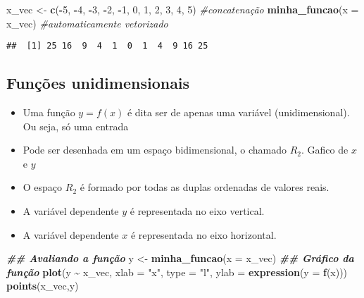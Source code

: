 \documentclass[
]{article}
\newenvironment{Shaded}{\begin{snugshade}}{\end{snugshade}}
\newcommand{\AttributeTok}[1]{\textcolor[rgb]{0.13,0.29,0.53}{#1}}
\newcommand{\CommentTok}[1]{\textcolor[rgb]{0.56,0.35,0.01}{\textit{#1}}}
\newcommand{\DecValTok}[1]{\textcolor[rgb]{0.00,0.00,0.81}{#1}}
\newcommand{\DocumentationTok}[1]{\textcolor[rgb]{0.56,0.35,0.01}{\textbf{\textit{#1}}}}
\newcommand{\FunctionTok}[1]{\textcolor[rgb]{0.13,0.29,0.53}{\textbf{#1}}}
\newcommand{\NormalTok}[1]{#1}
\newcommand{\OtherTok}[1]{\textcolor[rgb]{0.56,0.35,0.01}{#1}}
\newcommand{\SpecialCharTok}[1]{\textcolor[rgb]{0.81,0.36,0.00}{\textbf{#1}}}
\newcommand{\StringTok}[1]{\textcolor[rgb]{0.31,0.60,0.02}{#1}}
\providecommand{\tightlist}{%
  \setlength{\itemsep}{0pt}\setlength{\parskip}{0pt}}
\begin{document}
\begin{Shaded}
\begin{Highlighting}[]
\NormalTok{x\_vec }\OtherTok{\textless{}{-}} \FunctionTok{c}\NormalTok{(}\SpecialCharTok{{-}}\DecValTok{5}\NormalTok{, }\SpecialCharTok{{-}}\DecValTok{4}\NormalTok{, }\SpecialCharTok{{-}}\DecValTok{3}\NormalTok{, }\SpecialCharTok{{-}}\DecValTok{2}\NormalTok{, }\SpecialCharTok{{-}}\DecValTok{1}\NormalTok{,}
\DecValTok{0}\NormalTok{, }\DecValTok{1}\NormalTok{, }\DecValTok{2}\NormalTok{, }\DecValTok{3}\NormalTok{, }\DecValTok{4}\NormalTok{, }\DecValTok{5}\NormalTok{) }\CommentTok{\#concatenação}
\FunctionTok{minha\_funcao}\NormalTok{(}\AttributeTok{x =}\NormalTok{ x\_vec) }\CommentTok{\#automaticamente vetorizado}
\end{Highlighting}
\end{Shaded}

\begin{verbatim}
##  [1] 25 16  9  4  1  0  1  4  9 16 25
\end{verbatim}

\hypertarget{funuxe7uxf5es-unidimensionais}{%
\subsection{Funções
unidimensionais}\label{funuxe7uxf5es-unidimensionais}}

\begin{itemize}
\tightlist
\item
  Uma função \(y = f(x)\) é dita ser de apenas uma variável
  (unidimensional). Ou seja, só uma entrada
\item
  Pode ser desenhada em um espaço bidimensional, o chamado \(R_{2}\).
  Gafico de \(x\) e \(y\)
\item
  O espaço \(R_{2}\) é formado por todas as duplas ordenadas de valores
  reais.
\item
  A variável dependente \(y\) é representada no eixo vertical.
\item
  A variável dependente \(x\) é representada no eixo horizontal.
\end{itemize}

\begin{Shaded}
\begin{Highlighting}[]
\DocumentationTok{\#\# Avaliando a função}
\NormalTok{y }\OtherTok{\textless{}{-}} \FunctionTok{minha\_funcao}\NormalTok{(}\AttributeTok{x =}\NormalTok{ x\_vec)}
\DocumentationTok{\#\# Gráfico da função}
\FunctionTok{plot}\NormalTok{(y }\SpecialCharTok{\textasciitilde{}}\NormalTok{ x\_vec, }\AttributeTok{xlab =} \StringTok{"x"}\NormalTok{, }\AttributeTok{type =} \StringTok{"l"}\NormalTok{,}
\AttributeTok{ylab =} \FunctionTok{expression}\NormalTok{(}\AttributeTok{y =} \FunctionTok{f}\NormalTok{(x)))}
\FunctionTok{points}\NormalTok{(x\_vec,y)}
\end{Highlighting}
\end{Shaded}
\end{document}
